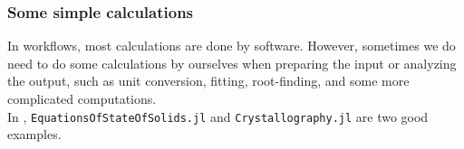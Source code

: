 \subsubsection{Some simple calculations}

\begin{frame}{\subsubsecname}
    In \ab{} workflows, most calculations are done by \ab{} software.
    However, sometimes we do need to do some calculations by ourselves when preparing the input
    or analyzing the output, such as unit conversion, fitting, root-finding, and some more
    complicated computations.\\

    In \express{}, \texttt{EquationsOfStateOfSolids.jl} and \texttt{Crystallography.jl}
    are two good examples.
\end{frame}

